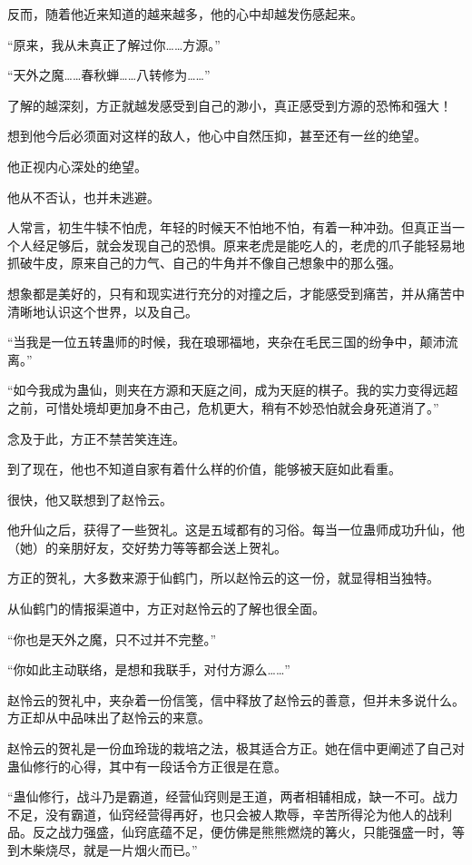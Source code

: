 \begin{this_body}
反而，随着他近来知道的越来越多，他的心中却越发伤感起来。

“原来，我从未真正了解过你……方源。”

“天外之魔……春秋蝉……八转修为……”

了解的越深刻，方正就越发感受到自己的渺小，真正感受到方源的恐怖和强大！

想到他今后必须面对这样的敌人，他心中自然压抑，甚至还有一丝的绝望。

他正视内心深处的绝望。

他从不否认，也并未逃避。

人常言，初生牛犊不怕虎，年轻的时候天不怕地不怕，有着一种冲劲。但真正当一个人经足够后，就会发现自己的恐惧。原来老虎是能吃人的，老虎的爪子能轻易地抓破牛皮，原来自己的力气、自己的牛角并不像自己想象中的那么强。

想象都是美好的，只有和现实进行充分的对撞之后，才能感受到痛苦，并从痛苦中清晰地认识这个世界，以及自己。

“当我是一位五转蛊师的时候，我在琅琊福地，夹杂在毛民三国的纷争中，颠沛流离。”

“如今我成为蛊仙，则夹在方源和天庭之间，成为天庭的棋子。我的实力变得远超之前，可惜处境却更加身不由己，危机更大，稍有不妙恐怕就会身死道消了。”

念及于此，方正不禁苦笑连连。

到了现在，他也不知道自家有着什么样的价值，能够被天庭如此看重。

很快，他又联想到了赵怜云。

他升仙之后，获得了一些贺礼。这是五域都有的习俗。每当一位蛊师成功升仙，他（她）的亲朋好友，交好势力等等都会送上贺礼。

方正的贺礼，大多数来源于仙鹤门，所以赵怜云的这一份，就显得相当独特。

从仙鹤门的情报渠道中，方正对赵怜云的了解也很全面。

“你也是天外之魔，只不过并不完整。”

“你如此主动联络，是想和我联手，对付方源么……”

赵怜云的贺礼中，夹杂着一份信笺，信中释放了赵怜云的善意，但并未多说什么。方正却从中品味出了赵怜云的来意。

赵怜云的贺礼是一份血玲珑的栽培之法，极其适合方正。她在信中更阐述了自己对蛊仙修行的心得，其中有一段话令方正很是在意。

“蛊仙修行，战斗乃是霸道，经营仙窍则是王道，两者相辅相成，缺一不可。战力不足，没有霸道，仙窍经营得再好，也只会被人欺辱，辛苦所得沦为他人的战利品。反之战力强盛，仙窍底蕴不足，便仿佛是熊熊燃烧的篝火，只能强盛一时，等到木柴烧尽，就是一片烟火而已。”


\end{this_body}
